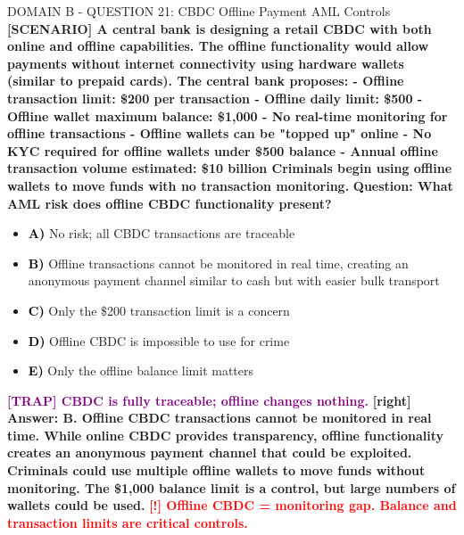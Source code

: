\documentclass[11pt,a4paper]{beamer}
\newcommand{\redflag}[1]{\textcolor{red}{\textbf{[!] #1}}}
\newcommand{\trap}[1]{\textcolor{purple}{\textbf{[TRAP] #1}}}
\newcommand{\correct}[1]{\textcolor{green!50!black}{\textbf{[right] #1}}}
\newcommand{\scenario}[1]{\textcolor{blue!70!black}{\textbf{[SCENARIO] #1}}}
\newcommand{\option}[1]{\textcolor{black}{\textbf{#1}}}
\begin{document}
\begin{frame}{DOMAIN B - QUESTION 21: CBDC Offline Payment AML Controls}
\scenario{A central bank is designing a retail CBDC with both online and offline capabilities. The offline functionality would allow payments without internet connectivity using hardware wallets (similar to prepaid cards). The central bank proposes:
- Offline transaction limit: \$200 per transaction
- Offline daily limit: \$500
- Offline wallet maximum balance: \$1,000
- No real-time monitoring for offline transactions
- Offline wallets can be "topped up" online
- No KYC required for offline wallets under \$500 balance
- Annual offline transaction volume estimated: \$10 billion
Criminals begin using offline wallets to move funds with no transaction monitoring.}
\vspace{0.2cm}
\textbf{Question: What AML risk does offline CBDC functionality present?}
\vspace{0.1cm}
\begin{itemize}
    \item \option{A)} No risk; all CBDC transactions are traceable
    \item \option{B)} Offline transactions cannot be monitored in real time, creating an anonymous payment channel similar to cash but with easier bulk transport
    \item \option{C)} Only the \$200 transaction limit is a concern
    \item \option{D)} Offline CBDC is impossible to use for crime
    \item \option{E)} Only the offline balance limit matters
\end{itemize}
\vspace{0.2cm}
\trap{CBDC is fully traceable; offline changes nothing.}
\correct{Answer: B. Offline CBDC transactions cannot be monitored in real time. While online CBDC provides transparency, offline functionality creates an anonymous payment channel that could be exploited. Criminals could use multiple offline wallets to move funds without monitoring. The \$1,000 balance limit is a control, but large numbers of wallets could be used.}
\redflag{Offline CBDC = monitoring gap. Balance and transaction limits are critical controls.}
\end{frame}
\end{document}
